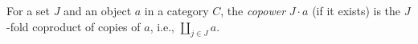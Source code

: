 For a set $J$ and an object $a$ in a category $C$, the \emph{copower} $J \cdot a$ (if it exists) is the $J$-fold coproduct of copies of $a$, i.e., $\coprod_{j \in J} a$.
